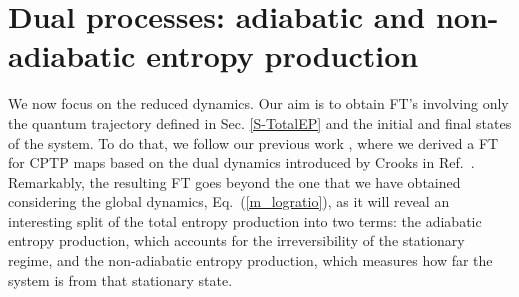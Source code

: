 \documentclass[aps,prx,twocolumn,showpacs,floatfix,superscriptaddress,graphics,longbibliography]{revtex4-1}
\begin{document}
\section{Dual processes: adiabatic and non-adiabatic entropy production}
\label{S-DecompositionFTs}

We now focus on the reduced dynamics. Our aim is to obtain FT's involving only the quantum trajectory defined in Sec. \ref{S-TotalEP} and the initial and final states of the system. To do that, we follow our previous work \cite{MHP}, where we derived a FT for CPTP maps based on the dual dynamics introduced by Crooks in Ref.~\cite{Crooks}. 
Remarkably, the resulting FT goes beyond the one that we have obtained considering the global dynamics, Eq.~(\ref{m_logratio}), as it will reveal an interesting split of the total entropy production into two terms: the adiabatic entropy production, which accounts for the irreversibility of the stationary regime, and the non-adiabatic entropy 
production, which measures how far the system is from that stationary state.
\end{document}
